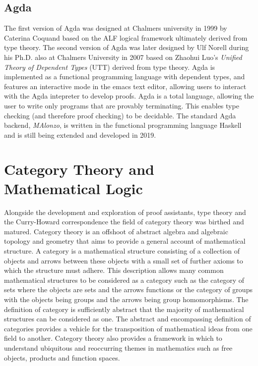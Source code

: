 \subsection{Agda}
The first version of Agda was designed at Chalmers university in 1999 by
Caterina Coquand \cite{coquand2000agda} based on the ALF logical framework
\cite{magnusson1993alf} ultimately derived from
\mlt type theory. The second version of Agda was later designed by Ulf
Norell during his Ph.D. also at Chalmers University in 2007
\cite{norell2007towards} based on Zhaohui Luo's
\textit{Unified Theory of Dependent Types} (UTT)  \cite{luo1992unifying} derived
from \mlt{} type
theory. Agda is implemented as a functional programming language with dependent
types, and features an interactive mode in the emacs text editor, allowing users
to interact with the Agda intepreter to develop proofs. Agda is a total
language, allowing the user to write only programs that are provably
terminating. This enables type checking (and therefore proof checking) to be
decidable. The standard Agda backend, \textit{MAlonzo}, is written in the
functional programming language Haskell and is still being extended and
developed in 2019.
\section{Category Theory and Mathematical Logic}
Alongside the development and exploration of  proof assistants, type theory and
the Curry-Howard correspondence the field of category theory was birthed and
matured. Category theory is an offshoot of abstract algebra and algebraic
topology and geometry that aims to provide a general account of mathematical
structure. A category is a mathematical structure consisting of a collection of
objects and arrows between these objects with a small set of further axioms to
which the structure must adhere. This description allows many common
mathematical structures to be considered as a category such as the category of
sets where the objects are sets and the arrows functions or the category of
groups with the objects being groups and the arrows being group homomorphisms.
The definition of category is sufficiently abstract that the majority of
mathematical structures can be considered as one. The abstract and encompassing
definition of categories provides a vehicle for the transposition of
mathematical ideas from one field to another. Category theory also provides a
framework in which to understand ubiquitous and reoccurring themes in mathematics
such as free objects, products and function spaces.
